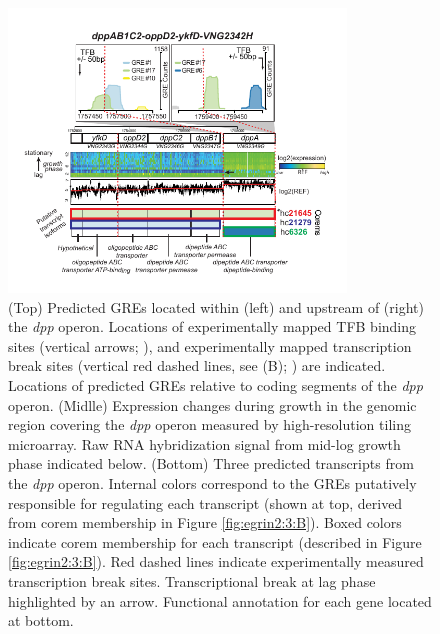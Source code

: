 \begin{figure}[h!]
    \centering
    \includegraphics[width=0.8\textwidth]{figures/egrin2_dpp_1}
 	\caption[Transcriptional evidence for multiple transcript isoforms from the same operon, \halo ]{(Top) Predicted GREs located within (left) and upstream of (right) the \halo \textit{dpp} operon. Locations of experimentally mapped TFB binding sites (vertical arrows; \cite{facciotti_general_2007}), and experimentally mapped transcription break sites (vertical red dashed lines, see (B); \cite{koide_prevalence_2009}) are indicated. Locations of predicted GREs relative to coding segments of the \textit{dpp} operon. (Midlle) Expression changes during growth in the genomic region covering the \textit{dpp} operon measured by high-resolution tiling microarray. Raw RNA hybridization signal from mid-log growth phase indicated below. (Bottom) Three predicted transcripts from the \textit{dpp} operon. Internal colors correspond to the GREs putatively responsible for regulating each transcript (shown at top, derived from corem membership in Figure \ref{fig:egrin2:3:B}). Boxed colors indicate corem membership for each transcript (described in Figure \ref{fig:egrin2:3:B}). Red dashed lines indicate experimentally measured transcription break sites. Transcriptional break at lag phase highlighted by an arrow. Functional annotation for each gene located at bottom.
}
    \label{fig:egrin2:3:A}
\end{figure}

